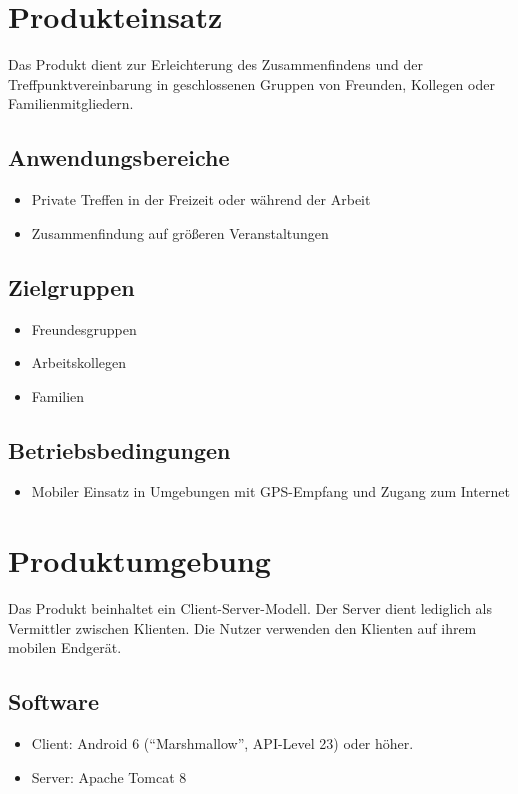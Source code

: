 \documentclass[parskip=full,11pt]{scrartcl}
\begin{document}
\pagebreak
\section{Produkteinsatz}
Das Produkt dient zur Erleichterung des Zusammenfindens und der
Treffpunktvereinbarung in geschlossenen Gruppen von Freunden, Kollegen oder
Familienmitgliedern.

\subsection{Anwendungsbereiche}
\begin{itemize}
    \item Private Treffen in der Freizeit oder während der Arbeit
    \item Zusammenfindung auf größeren Veranstaltungen
\end{itemize}

\subsection{Zielgruppen}
\begin{itemize}
    \item Freundesgruppen
    \item Arbeitskollegen
    \item Familien
\end{itemize}

\subsection{Betriebsbedingungen}
\begin{itemize}
    \item Mobiler Einsatz in Umgebungen mit GPS-Empfang und Zugang zum Internet
\end{itemize}

\section{Produktumgebung}
Das Produkt beinhaltet ein Client-Server-Modell.
Der Server dient lediglich als Vermittler zwischen Klienten.
Die Nutzer verwenden den Klienten auf ihrem mobilen Endgerät.
\subsection{Software}
\begin{itemize}
    \item Client: Android 6 (\enquote{Marshmallow}, API-Level 23) oder
        höher.
    \item Server: Apache Tomcat 8
\end{itemize}
\end{document}
